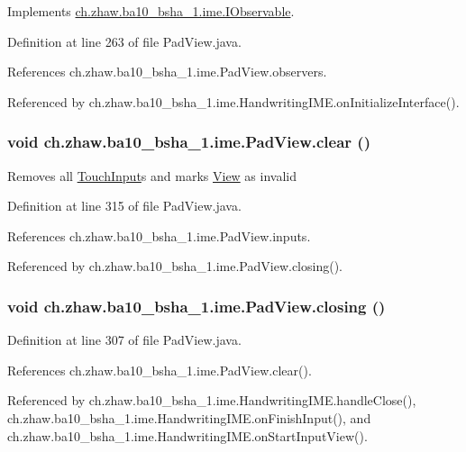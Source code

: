 Implements \hyperlink{interfacech_1_1zhaw_1_1ba10__bsha__1_1_1ime_1_1IObservable_ab05b466951c1b4c9c05644c27cf3fd9f}{ch.zhaw.ba10\_\-bsha\_\-1.ime.IObservable}.

Definition at line 263 of file PadView.java.

References ch.zhaw.ba10\_\-bsha\_\-1.ime.PadView.observers.

Referenced by ch.zhaw.ba10\_\-bsha\_\-1.ime.HandwritingIME.onInitializeInterface().\hypertarget{classch_1_1zhaw_1_1ba10__bsha__1_1_1ime_1_1PadView_a5bfac21895a5740fef99268846f223ef}{
\subsubsection[{clear}]{\setlength{\rightskip}{0pt plus 5cm}void ch.zhaw.ba10\_\-bsha\_\-1.ime.PadView.clear ()}}
\label{classch_1_1zhaw_1_1ba10__bsha__1_1_1ime_1_1PadView_a5bfac21895a5740fef99268846f223ef}
Removes all \hyperlink{classch_1_1zhaw_1_1ba10__bsha__1_1_1ime_1_1TouchInput}{TouchInput}s and marks \hyperlink{}{View} as invalid 

Definition at line 315 of file PadView.java.

References ch.zhaw.ba10\_\-bsha\_\-1.ime.PadView.inputs.

Referenced by ch.zhaw.ba10\_\-bsha\_\-1.ime.PadView.closing().\hypertarget{classch_1_1zhaw_1_1ba10__bsha__1_1_1ime_1_1PadView_a4e5d62bdc50d1efae84f0cde40beeb51}{
\subsubsection[{closing}]{\setlength{\rightskip}{0pt plus 5cm}void ch.zhaw.ba10\_\-bsha\_\-1.ime.PadView.closing ()}}
\label{classch_1_1zhaw_1_1ba10__bsha__1_1_1ime_1_1PadView_a4e5d62bdc50d1efae84f0cde40beeb51}


Definition at line 307 of file PadView.java.

References ch.zhaw.ba10\_\-bsha\_\-1.ime.PadView.clear().

Referenced by ch.zhaw.ba10\_\-bsha\_\-1.ime.HandwritingIME.handleClose(), ch.zhaw.ba10\_\-bsha\_\-1.ime.HandwritingIME.onFinishInput(), and ch.zhaw.ba10\_\-bsha\_\-1.ime.HandwritingIME.onStartInputView().

